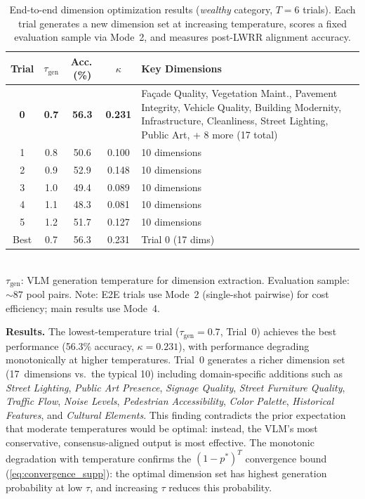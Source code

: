 \documentclass[runningheads]{llncs}
\begin{document}
\begin{table}[ht]
\centering
\caption{End-to-end dimension optimization results (\emph{wealthy} category, $T{=}6$ trials). Each trial generates a new dimension set at increasing temperature, scores a fixed evaluation sample via Mode~2, and measures post-LWRR alignment accuracy.}
\label{tab:e2e}
\small
\begin{tabular}{ccccp{5.8cm}}
\toprule
Trial & $\tau_{\mathrm{gen}}$ & Acc.\,(\%) & $\kappa$ & Key Dimensions \\
\midrule
\textbf{0} & \textbf{0.7} & \textbf{56.3} & \textbf{0.231} & Fa\c{c}ade Quality, Vegetation Maint., Pavement Integrity, Vehicle Quality, Building Modernity, Infrastructure, Cleanliness, Street Lighting, Public Art, + 8 more (17 total) \\
1 & 0.8 & 50.6 & 0.100 & 10 dimensions \\
2 & 0.9 & 52.9 & 0.148 & 10 dimensions \\
3 & 1.0 & 49.4 & 0.089 & 10 dimensions \\
4 & 1.1 & 48.3 & 0.081 & 10 dimensions \\
5 & 1.2 & 51.7 & 0.127 & 10 dimensions \\
\midrule
Best & 0.7 & 56.3 & 0.231 & Trial 0 (17 dims) \\
\bottomrule
\end{tabular}
\\[4pt]
\footnotesize{$\tau_{\mathrm{gen}}$: VLM generation temperature for dimension extraction. Evaluation sample: ${\sim}87$ pool pairs.
Note: E2E trials use Mode~2 (single-shot pairwise) for cost efficiency; main results use Mode~4.}
\end{table}

\smallskip\noindent\textbf{Results.}
The lowest-temperature trial ($\tau_{\mathrm{gen}}{=}0.7$, Trial~0) achieves the best performance (56.3\% accuracy, $\kappa{=}0.231$), with performance degrading monotonically at higher temperatures.
Trial~0 generates a richer dimension set (17~dimensions vs.\ the typical 10) including domain-specific additions such as \emph{Street Lighting}, \emph{Public Art Presence}, \emph{Signage Quality}, \emph{Street Furniture Quality}, \emph{Traffic Flow}, \emph{Noise Levels}, \emph{Pedestrian Accessibility}, \emph{Color Palette}, \emph{Historical Features}, and \emph{Cultural Elements}.
This finding contradicts the prior expectation that moderate temperatures would be optimal: instead, the VLM's most conservative, consensus-aligned output is most effective.
The monotonic degradation with temperature confirms the $(1{-}p^*)^T$ convergence bound (\cref{eq:convergence_supp}): the optimal dimension set has highest generation probability at low $\tau$, and increasing $\tau$ reduces this probability.
\end{document}
